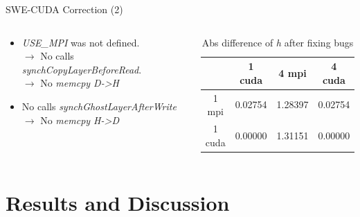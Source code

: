 \documentclass[
  english,            %
  aspectratio=169,    %
  11pt
]{tumbeamer}
\begin{document}
\begin{frame}{SWE-CUDA Correction (2)}
\begin{columns}
	\begin{column}{.48\textwidth}
	\vfill
	\begin{itemize}
		\item \textit{USE\_MPI} was not defined.\\
		$\rightarrow$ No calls \textit{\small synchCopyLayerBeforeRead}.\\
		$\rightarrow$ No \textit{memcpy D->H}
		\newline
		\item No calls \textit{synchGhostLayerAfterWrite} \\
		$\rightarrow$ No \textit{memcpy H->D}
	\end{itemize}
	\end{column}
	
	\begin{column}{.45\textwidth}
\begin{table}

\begin{tabular}{ |c|c|c|c|}
	\hline
	& 1 cuda      & 4 mpi  & 4 cuda \\
	\hline
	1 mpi & 0.02754     & 1.28397& 0.02754 \\
	\hline
	1 cuda& 0.00000     & 1.31151& 0.00000\\
	\hline
\end{tabular}
\caption{Abs difference of \textit{h} after fixing bugs}	
\end{table}
	\end{column}
\end{columns}
\end{frame}




\section{Results and Discussion}
\end{document}
